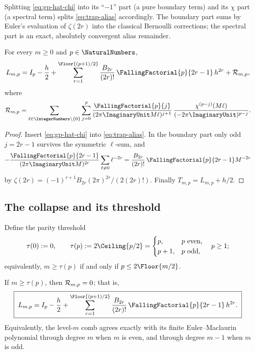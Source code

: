 Splitting \eqref{eq:gp-hat-chi} into its ``$-1$'' part (a pure
boundary term) and its $\chi$ part (a spectral term) splits
\eqref{eq:trap-alias} accordingly.  The boundary part sums by Euler's
evaluation of $\zeta(2r)$ into the classical Bernoulli corrections; the
spectral part is an exact, absolutely convergent alias remainder.

\begin{theorem}
\label{thm:EM-remainder}
For every $m\ge0$ and $p\in\NaturalNumbers$,
\begin{equation}
 L_{m,p}=I_p-\frac h2+
 \sum_{r=1}^{\Floor{(p+1)/2}}
 \frac{B_{2r}}{(2r)!}\,\FallingFactorial{p}{2r-1}\,h^{2r}
 +\defect_{m,p},
 \label{eq:EM-exact-remainder}
\end{equation}
where
\begin{equation}
 \defect_{m,p}
 =\sum_{\ell\in\IntegerNumbers\setminus\{0\}}
 \sum_{j=0}^{p}
 \frac{\FallingFactorial{p}{j}}{(2\pi\ImaginaryUnit M\ell)^{j+1}}\,
 \frac{\chi^{(p-j)}(M\ell)}{(-2\pi\ImaginaryUnit)^{p-j}}.
 \label{eq:R-alias}
\end{equation}
\end{theorem}

\begin{proof}
Insert \eqref{eq:gp-hat-chi} into \eqref{eq:trap-alias}.  In the
boundary part only odd $j=2r-1$ survives the symmetric $\ell$-sum, and
\[
 -\frac{\FallingFactorial{p}{2r-1}}{(2\pi\ImaginaryUnit M)^{2r}}\sum_{\ell\ne0}\ell^{-2r}
 =\frac{B_{2r}}{(2r)!}\,\FallingFactorial{p}{2r-1}M^{-2r}
\]
by $\zeta(2r)=(-1)^{r+1}B_{2r}(2\pi)^{2r}/(2(2r)!)$.  Finally
$T_{m,p}=L_{m,p}+h/2$.
\end{proof}

\subsection{The collapse and its threshold}

Define the parity threshold
\begin{equation}
 \tau(0):=0,
 \qquad
 \tau(p):=2\Ceiling{p/2}
 =\begin{cases}p,&p\text{ even},\\ p+1,&p\text{ odd},\end{cases}
 \quad p\ge1;
 \label{eq:tau}
\end{equation}
equivalently, $m\ge\tau(p)$ if and only if $p\le2\Floor{m/2}$.

\begin{theorem}
\label{thm:EM-collapse}
If $m\ge\tau(p)$, then $\mathcal R_{m,p}=0$; that is,
\begin{equation}
 \boxed{\;
 L_{m,p}=I_p-\frac h2+
 \sum_{r=1}^{\Floor{(p+1)/2}}
 \frac{B_{2r}}{(2r)!}\,\FallingFactorial{p}{2r-1}\,h^{2r}.
 \;}
 \label{eq:EM-collapse}
\end{equation}
Equivalently, the level-$m$ comb agrees exactly with its finite
Euler--Maclaurin polynomial through degree $m$ when $m$ is even, and
through degree $m-1$ when $m$ is odd.
\end{theorem}

